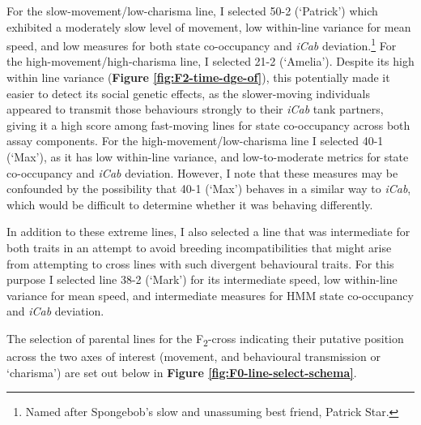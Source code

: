 \documentclass[
]{book}
\begin{document}
For the slow-movement/low-charisma line, I selected \textcolor{50-2 (‘Patrick’)_BB81FF}{50-2 (‘Patrick’)} which exhibited a moderately slow level of movement, low within-line variance for mean speed, and low measures for both state co-occupancy and \emph{\textcolor{iCab_424B4D}{iCab}} deviation.\footnote{Named after Spongebob's slow and unassuming best friend, Patrick Star.} For the high-movement/high-charisma line, I selected \textcolor{21-2 (‘Amelia’)_49B500}{21-2 (‘Amelia’)}. Despite its high within line variance (\textbf{Figure \ref{fig:F2-time-dge-of}}), this potentially made it easier to detect its social genetic effects, as the slower-moving individuals appeared to transmit those behaviours strongly to their \emph{\textcolor{iCab_424B4D}{iCab}} tank partners, giving it a high score among fast-moving lines for state co-occupancy across both assay components. For the high-movement/low-charisma line I selected \textcolor{40-1 (‘Max’)_93AA00}{40-1 (‘Max’)}, as it has low within-line variance, and low-to-moderate metrics for state co-occupancy and \emph{\textcolor{iCab_424B4D}{iCab}} deviation. However, I note that these measures may be confounded by the possibility that \textcolor{40-1 (‘Max’)_93AA00}{40-1 (‘Max’)} behaves in a similar way to \emph{\textcolor{iCab_424B4D}{iCab}}, which would be difficult to determine whether it was behaving differently.

In addition to these extreme lines, I also selected a line that was intermediate for both traits in an attempt to avoid breeding incompatibilities that might arise from attempting to cross lines with such divergent behavioural traits. For this purpose I selected line \textcolor{38-2 (‘Mark’)_00C08B}{38-2 (‘Mark’)} for its intermediate speed, low within-line variance for mean speed, and intermediate measures for HMM state co-occupancy and \emph{\textcolor{iCab_424B4D}{iCab}} deviation.

The selection of parental lines for the F\textsubscript{2}-cross indicating their putative position across the two axes of interest (movement, and behavioural transmission or `charisma') are set out below in \textbf{Figure \ref{fig:F0-line-select-schema}}.
\end{document}
